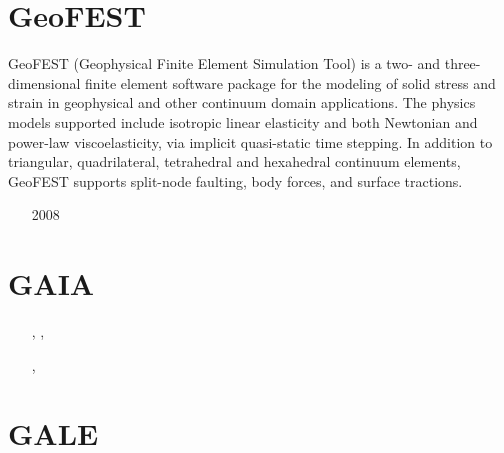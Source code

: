 \section{GeoFEST} 
GeoFEST (Geophysical Finite Element Simulation Tool) is a two- and three-dimensional finite
element software package for the modeling of solid stress and strain in geophysical and 
other continuum domain applications.
The physics models supported include isotropic linear elasticity and both Newtonian and power-law
viscoelasticity, via implicit quasi-static time stepping. In addition to triangular, 
quadrilateral, tetrahedral and hexahedral continuum elements, GeoFEST supports split-node 
faulting, body forces, and surface tractions.


\begin{small}
\begin{itemize}
\item[2008] \textcite{paln08}
\end{itemize}
\end{small}


\section{GAIA} 

\begin{small}
\begin{itemize}
\item[\twothousandeight]     \textcite{hust08b} 
\item[\twothousandeleven]    \textcite{toyu11} 
\item[\twothousandtwelve]    \textcite{nobs12}
\item[\twothousandthirteen]  \textcite{hutm13},  \textcite{plth13},  \textcite{nobr13} 
\item[\twothousandeighteen]  \textcite{plpt18}
\item[\twothousandnineteen]  \textcite{neum19}
\item[\twothousandtwenty]    \textcite{agtb20},  \textcite{sctp20}
\end{itemize}
\end{small}


\section{GALE} 

